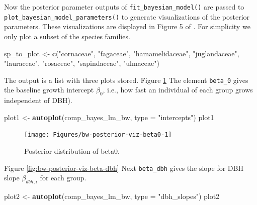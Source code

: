 \documentclass[12pt]{article}
\newenvironment{Shaded}{\begin{snugshade}}{\end{snugshade}}
\newcommand{\DataTypeTok}[1]{\textcolor[rgb]{0.13,0.29,0.53}{#1}}
\newcommand{\KeywordTok}[1]{\textcolor[rgb]{0.13,0.29,0.53}{\textbf{#1}}}
\newcommand{\NormalTok}[1]{#1}
\newcommand{\StringTok}[1]{\textcolor[rgb]{0.31,0.60,0.02}{#1}}
\begin{document}
Now the posterior parameter outputs of \texttt{fit\_bayesian\_model()}
are passed to \texttt{plot\_bayesian\_model\_parameters()} to generate
visualizations of the posterior parameters. These visualizations are
displayed in Figure 5 of \citet{allen_permutation_2020}. For simplicity
we only plot a subset of the species families.

\begin{Shaded}
\begin{Highlighting}[]
\NormalTok{sp_to_plot <-}\StringTok{ }\KeywordTok{c}\NormalTok{(}\StringTok{"cornaceae"}\NormalTok{, }\StringTok{"fagaceae"}\NormalTok{, }\StringTok{"hamamelidaceae"}\NormalTok{, }\StringTok{"juglandaceae"}\NormalTok{, }
                 \StringTok{"lauraceae"}\NormalTok{, }\StringTok{"rosaceae"}\NormalTok{, }\StringTok{"sapindaceae"}\NormalTok{, }\StringTok{"ulmaceae"}\NormalTok{)}
\end{Highlighting}
\end{Shaded}

The output is a list with three plots stored. Figure
\ref{fig:bw-posterior-viz-beta0} The element \texttt{beta\_0} gives the
baseline growth intercept \(\beta_0\), i.e., how fast an individual of
each group grows independent of DBH).

\begin{Shaded}
\begin{Highlighting}[]
\NormalTok{plot1 <-}\StringTok{ }\KeywordTok{autoplot}\NormalTok{(comp_bayes_lm_bw, }\DataTypeTok{type =} \StringTok{"intercepts"}\NormalTok{)}
\NormalTok{plot1}
\end{Highlighting}
\end{Shaded}

\begin{figure}

{\centering \texttt{[image: Figures/bw-posterior-viz-beta0-1]} 

}

\caption{Posterior distribution of beta0.}\label{fig:bw-posterior-viz-beta0}
\end{figure}

Figure \ref{fig:bw-posterior-viz-beta-dbh} Next \texttt{beta\_dbh} gives
the slope for DBH slope \(\beta_{dbh,i}\) for each group.

\begin{Shaded}
\begin{Highlighting}[]
\NormalTok{plot2 <-}\StringTok{ }\KeywordTok{autoplot}\NormalTok{(comp_bayes_lm_bw, }\DataTypeTok{type =} \StringTok{"dbh_slopes"}\NormalTok{)}
\NormalTok{plot2}
\end{Highlighting}
\end{Shaded}
\end{document}
